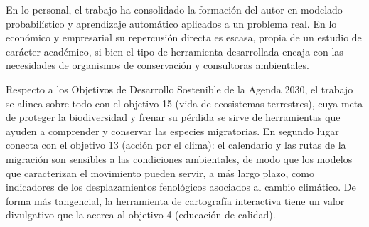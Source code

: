 En lo personal, el trabajo ha consolidado la formación del autor en modelado
probabilístico y aprendizaje automático aplicados a un problema real. En lo
económico y empresarial su repercusión directa es escasa, propia de un estudio de
carácter académico, si bien el tipo de herramienta desarrollada encaja con las
necesidades de organismos de conservación y consultoras ambientales.

Respecto a los Objetivos de Desarrollo Sostenible de la Agenda 2030, el trabajo se
alinea sobre todo con el objetivo 15 (vida de ecosistemas terrestres), cuya meta de
proteger la biodiversidad y frenar su pérdida se sirve de herramientas que ayuden a
comprender y conservar las especies migratorias. En segundo lugar conecta con el
objetivo 13 (acción por el clima): el calendario y las rutas de la migración son
sensibles a las condiciones ambientales, de modo que los modelos que caracterizan
el movimiento pueden servir, a más largo plazo, como indicadores de los
desplazamientos fenológicos asociados al cambio climático. De forma más tangencial,
la herramienta de cartografía interactiva tiene un valor divulgativo que la acerca
al objetivo 4 (educación de calidad).
